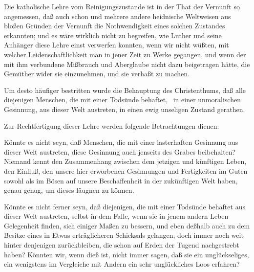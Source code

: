 \begin{aufza}
\begin{aufzb}
\begin{RWanm} 
Die katholische Lehre vom Reinigungszustande ist in der That der Vernunft so angemessen, daß auch schon  und mehrere andere heidnische Weltweisen aus bloßen Gründen der Vernunft die Nothwendigkeit eines solchen Zustandes erkannten; und es wäre wirklich nicht zu begreifen, wie Luther und seine Anhänger diese Lehre einst verwerfen konnten, wenn wir nicht wüßten, mit welcher Leidenschaftlichkeit man in jener Zeit zu Werke gegangen, und wenn der mit ihm verbundene Mißbrauch und Aberglaube nicht dazu beigetragen hätte, die Gemüther wider sie einzunehmen, und sie verhaßt zu machen.
\end{RWanm}
\item {} Um desto häufiger bestritten wurde die Behauptung des Christenthums, daß alle diejenigen Menschen, die mit einer Todsünde behaftet, \dh\ in einer unmoralischen Gesinnung, aus dieser Welt austreten, in einen ewig unseligen Zustand gerathen.\par
Zur Rechtfertigung dieser Lehre werden folgende Betrachtungen dienen: 
\begin{aufzc}
\item Könnte es nicht seyn, daß Menschen, die mit einer lasterhaften Gesinnung aus dieser Welt austreten, diese Gesinnung auch jenseits des Grabes beibehalten? Niemand kennt den Zusammenhang zwischen dem jetzigen und künftigen Leben, den Einfluß, den unsere hier erworbenen Gesinnungen und Fertigkeiten im Guten sowohl als im Bösen auf unsere Beschaffenheit in der zukünftigen Welt haben, genau genug, um dieses läugnen zu können.
\item Könnte es nicht ferner seyn, daß diejenigen, die mit einer Todsünde behaftet aus dieser Welt austreten, selbst in dem Falle, wenn sie in jenem andern Leben Gelegenheit finden, sich einiger Maßen zu bessern, und eben deßhalb auch zu dem Besitze eines in Etwas erträglicheren Schicksals gelangen, doch immer noch weit hinter denjenigen zurückbleiben, die schon auf Erden der Tugend nachgestrebt haben? Könnten wir, wenn dieß ist, nicht immer sagen, daß sie ein unglückseliges, ein wenigstens im Vergleiche mit Andern ein sehr unglückliches Loos erfahren?

\end{aufzc}
\end{aufzb}
\end{aufza}
